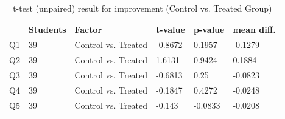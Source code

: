 \begin{table}[ht]
	\centering	
	\begin{tabular}{|p{1cm}|p{1.5cm}|p{4.5cm}|p{1.5cm}|p{1.5cm}|p{1.5cm}|}
		\hline
		\rowcolor[gray]{.8}	
		\textbf{} & \textbf{Students} & \textbf{Factor} & \textbf{t-value} & \textbf{p-value} & \textbf{mean diff.}\\
		\hline
		Q1 & 39 & Control vs. Treated & -0.8672 & 0.1957 & -0.1279\\
		\hline
		Q2 & 39 & Control vs. Treated & 1.6131 & 0.9424 & 0.1884\\
		\hline
		Q3 & 39 & Control vs. Treated & -0.6813 & 0.25 & -0.0823\\
		\hline	
		Q4 & 39 & Control vs. Treated & -0.1847 & 0.4272 & -0.0248\\
		\hline
		Q5 & 39 & Control vs. Treated & -0.143 & -0.0833 & -0.0208\\
		\hline			
	\end{tabular}
	\caption{t-test (unpaired) result for improvement (Control vs. Treated Group)}
	\label{tab:t-test_controltreated}
\end{table}
